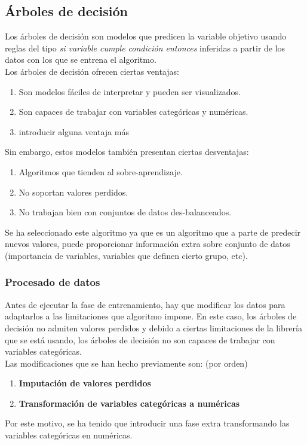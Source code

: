 \subsection{Árboles de decisión}
\label{alg:dec_tree}
Los árboles de decisión son modelos que predicen la variable objetivo usando reglas del tipo \textit{si variable cumple condición entonces } inferidas a partir de los datos con los que se entrena el algoritmo.\\
Los árboles de decisión ofrecen ciertas ventajas:
\begin{enumerate}
	\item Son modelos fáciles de interpretar y pueden ser visualizados.
	\item Son capaces de trabajar con variables categóricas y numéricas.
	\item introducir alguna ventaja más
\end{enumerate}
Sin embargo, estos modelos también presentan ciertas desventajas:
\begin{enumerate}
	\item Algoritmos que tienden al sobre-aprendizaje.
	\item No soportan valores perdidos.
	\item No trabajan bien con conjuntos de datos des-balanceados.
\end{enumerate}
Se ha seleccionado este algoritmo ya que es un algoritmo que a parte de predecir nuevos valores, puede proporcionar información extra sobre conjunto de datos (importancia de variables, variables que definen cierto grupo, etc).
\subsubsection{Procesado de datos}
Antes de ejecutar la fase de entrenamiento, hay que modificar los datos para adaptarlos a las limitaciones que algoritmo impone. En este caso,  los árboles de decisión no admiten valores perdidos y debido a ciertas limitaciones de la librería que se está usando, los árboles de decisión no son capaces de trabajar con variables categóricas.\\
Las modificaciones que se han hecho previamente son: (por orden)
\begin{enumerate}
	\item \textbf{Imputación de valores perdidos}
	\item \textbf{Transformación de variables categóricas a numéricas}
\end{enumerate}
 Por este motivo, se ha tenido que introducir una fase extra transformando las variables categóricas en numéricas.
